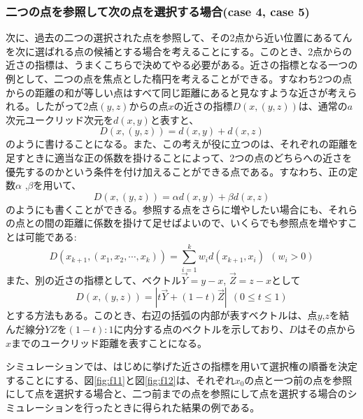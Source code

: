 \subsubsection{二つの点を参照して次の点を選択する場合(case 4, case 5)}

次に、過去の二つの選択された点を参照して、その2点から近い位置にあるてんを次に選ばれる点の候補とする場合を考えることにする。このとき、2点からの近さの指標は、うまくこちらで決めてやる必要がある。近さの指標となる一つの例として、二つの点を焦点とした楕円を考えることができる。すなわち2つの点からの距離の和が等しい点はすべて同じ距離にあると見なすような近さが考えられる。したがって2点$(y, z)$からの点$x$の近さの指標$D(x, (y, z))$は、通常の$a$次元ユークリッド次元を$d(x,y)$と表すと、
$$D(x, (y, z)) = d(x,y) + d(x, z)$$
のように書けることになる。また、この考えが役に立つのは、それぞれの距離を足すときに適当な正の係数を掛けることによって、2つの点のどちらへの近さを優先するのかという条件を付け加えることができる点である。すなわち、正の定数$\alpha$ ,$\beta$を用いて、
$$D(x, (y, z)) = \alpha d(x,y) + \beta d(x, z)$$
のようにも書くことができる。参照する点をさらに増やしたい場合にも、それらの点との間の距離に係数を掛けて足せばよいので、いくらでも参照点を増やすことは可能である:
$$D(x_{k+1}, (x_{1}, x_{2}, \cdots , x_{k})) = \sum_{i=1}^{k}w_{i}d(x_{k+1}, x_{i})\ \ (w_{i} > 0)$$
また、別の近さの指標として、ベクトル$\vec{Y} = y-x$, $\vec{Z} = z-x$として
$$D(x, (y,z)) = |t\vec{Y} + (1-t)\vec{Z}|\ \ (0 \le t \le 1)$$
とする方法もある。このとき、右辺の括弧の内部が表すベクトルは、点$y$,$z$を結んだ線分$YZ$を$(1-t):1$に内分する点のベクトルを示しており、$D$はその点から$x$までのユークリッド距離を表すことになる。

シミュレーションでは、はじめに挙げた近さの指標を用いて選択権の順番を決定することにする、図\ref{fig:f11}と図\ref{fig:f12}は、それぞれ$x_{0}$の点と一つ前の点を参照にして点を選択する場合と、二つ前までの点を参照にして点を選択する場合のシミュレーションを行ったときに得られた結果の例である。


